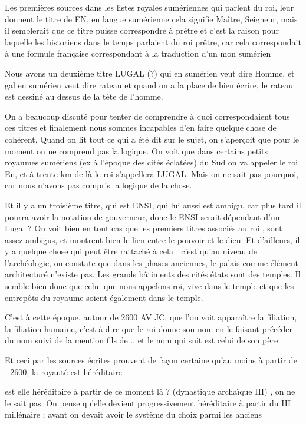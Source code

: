 \documentclass[a4paper,10pt]{article}
\begin{document}
Les premières sources dans les listes royales sumériennes qui parlent du
roi, leur donnent le titre de EN, en langue sumérienne cela signifie
Maître, Seigneur, mais il semblerait que ce titre puisse correspondre à
prêtre et c'est la raison pour laquelle les historiens
dans le temps parlaient du roi prêtre, car cela correspondait à une
formule française correspondant à la traduction d'un
mon sumérien 

Nous avons un deuxième titre  LUGAL (?) qui en sumérien veut dire Homme,
et gal en sumérien veut dire rateau et quand on a la place de bien
écrire, le rateau est dessiné au dessus de la tête de
l'homme.

On a beaucoup discuté pour tenter de comprendre à quoi correspondaient
tous ces titres et finalement nous sommes incapables
d'en faire quelque chose de cohérent, Quand on lit
tout ce qui a été dit sur le sujet, on s'aperçoit que
pour le moment on ne comprend pas la logique. On voit que dans certains
petits royaumes sumériens (ex à l'époque des cités
éclatées) du Sud on va appeler le roi En, et à trente km de là  le roi
s'appellera LUGAL. Mais on ne sait pas pourquoi, car
nous n'avons pas compris la logique de la chose.

Et il y a un troisième titre, qui est ENSI, qui lui aussi est ambigu,
car plus tard il pourra avoir la notation de gouverneur, donc le ENSI
serait dépendant d'un Lugal ?  On voit bien en tout
cas que les premiers titres associés au roi , sont assez ambigus, et
montrent bien le lien entre le pouvoir et le dieu. Et
d'ailleurs, il y a quelque chose qui peut être
rattaché à cela  : c'est qu'au niveau
de l'archéologie, on constate que dans les phases
anciennes, le palais comme élément architecturé
n'existe pas. Les grands bâtiments des cités états
sont des temples. Il semble bien donc que celui que nous appelons roi,
vive dans le temple et que les entrepôts du royaume soient également
dans le temple.

C'est à cette époque, autour de 2600 AV JC, que
l'on voit apparaître la filiation, la filiation
humaine, c'est à dire que le roi donne son nom en le
faisant précéder du nom suivi de la mention {\textquotedbl} fils de ..
{\textquotedbl} et le nom qui suit est celui de son père

Et ceci par les sources écrites prouvent de façon certaine
qu'au moins à partir de - 2600, la royauté est
héréditaire

est elle héréditaire à partir de ce moment là ? (dynastique archaïque
III) , on  ne le sait pas. On pense qu'elle devient
progressivement héréditaire à partir du III millénaire ; avant on
devait avoir le système du choix parmi les anciens
\end{document}
